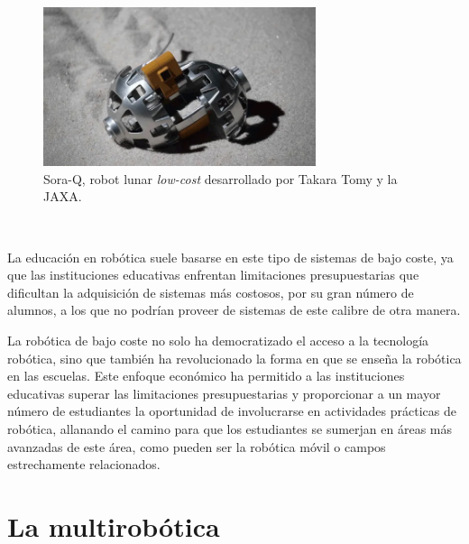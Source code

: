 \begin{figure} [h!]
  \begin{center}
    \includegraphics[width=8cm]{figs/SoraQ_lunar_robot_JAXA}
  \end{center}
  \caption{Sora-Q, robot lunar \textit{low-cost} desarrollado por Takara Tomy y la JAXA.}
  \label{fig:sora_q}
\end{figure}\

La educación en robótica suele basarse en este tipo de sistemas de bajo coste,
ya que las instituciones educativas enfrentan limitaciones presupuestarias que
dificultan la adquisición de sistemas más costosos, por su gran número de
alumnos, a los que no podrían proveer de sistemas de este calibre de otra
manera.

La robótica de bajo coste no solo ha democratizado el acceso a la tecnología
robótica, sino que también ha revolucionado la forma en que se enseña la
robótica en las escuelas.
Este enfoque económico ha permitido a las instituciones educativas superar las
limitaciones presupuestarias y proporcionar a un mayor número de estudiantes la
oportunidad de involucrarse en actividades prácticas de robótica, allanando el
camino para que los estudiantes se sumerjan en áreas más avanzadas de este área,
como pueden ser la robótica móvil o campos estrechamente relacionados.



\section{La multirobótica}
\label{sec:multirobotica} %


